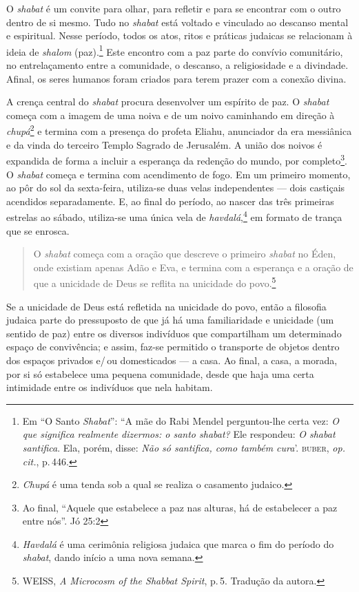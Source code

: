 O \emph{shabat} é um convite para olhar, para refletir e para se
encontrar com o outro dentro de si mesmo. Tudo no \emph{shabat} está
voltado e vinculado ao descanso mental e espiritual. Nesse período,
todos os atos, ritos e práticas judaicas se relacionam à ideia de
\emph{shalom} (paz).\footnote{Em ``O Santo \emph{Shabat}'': ``A
  mãe do Rabi Mendel perguntou-lhe certa vez: \emph{O que significa realmente
  dizermos: o santo \emph{shabat}?} Ele respondeu: \emph{O \emph{shabat} santifica}. Ela,
  porém, disse: \emph{Não só santifica, como também cura}'. \textsc{buber}, \emph{op.\,cit.}, p.\,446.} Este encontro com a paz parte do
convívio comunitário, no entrelaçamento entre a comunidade, o descanso,
a religiosidade e a divindade. Afinal, os seres humanos foram criados
para terem prazer com a conexão divina.

A crença central do \emph{shabat} procura desenvolver um espírito de
paz. O \emph{shabat} começa com a imagem de uma noiva e de um noivo
caminhando em direção à \emph{chupá}\footnote{\emph{Chupá} é uma tenda
  sob a qual se realiza o casamento judaico.} e termina com a presença
do profeta Eliahu, anunciador da era messiânica e da vinda do terceiro
Templo Sagrado de Jerusalém. A união dos noivos é expandida de forma a
incluir a esperança da redenção do mundo, por completo\footnote{Ao
  final, ``Aquele que estabelece a paz nas alturas, há de
  estabelecer a paz entre nós''. Jó 25:2}. O \emph{shabat} começa e termina com acendimento de
fogo. Em um primeiro momento, ao pôr do sol da sexta-feira, utiliza-se
duas velas independentes --- dois castiçais acendidos separadamente. E,
ao final do período, ao nascer das três primeiras estrelas ao sábado,
utiliza-se uma única vela de \emph{havdalá},\footnote{\emph{Havdalá} é
  uma cerimônia religiosa judaica que marca o fim do período do
  \emph{shabat}, dando início a uma nova semana.} em formato de trança
que se enrosca.

\begin{quote}
O \emph{shabat} começa com a oração que descreve o primeiro \emph{shabat} no Éden,
onde existiam apenas Adão e Eva, e termina com a esperança e a oração de
que a unicidade de Deus se reflita na unicidade do povo.\footnote{WEISS,
  \emph{A Microcosm of the Shabbat Spirit}, p.\,5. Tradução da autora.}
\end{quote}

Se a unicidade de Deus está refletida na unicidade do povo, então a
filosofia judaica parte do pressuposto de que já há uma familiaridade e
unicidade (um sentido de paz) entre os diversos indivíduos que
compartilham um determinado espaço de convivência; e assim, faz-se
permitido o transporte de objetos dentro dos espaços privados e/\,ou
domesticados --- a casa. Ao final, a casa, a morada, por si só
estabelece uma pequena comunidade, desde que haja uma certa intimidade
entre os indivíduos que nela habitam.

